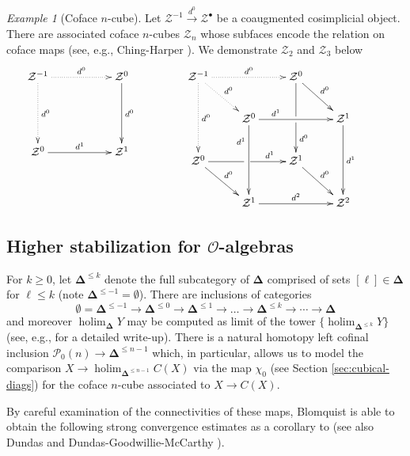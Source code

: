 \documentclass[11pt]{amsart}
\theoremstyle{definition}
\theoremstyle{remark}
\newtheorem{example}[subsection]{Example}
\newcommand{\holim}{\operatorname{holim}}
\newcommand{\Cal}[1]{\mathcal{#1}}
\newcommand{\bdel}{\mathbf{\Delta}}
\begin{document}
\begin{example}[Coface $n$-cube]
    Let $\Cal{Z}^{-1}\xrightarrow{d^0} \Cal{Z}^{\bullet}$ be a coaugmented cosimplicial object. There are associated coface $n$-cubes $\Cal{Z}_n$ whose subfaces encode the relation on coface maps (see, e.g.,  Ching-Harper \cite[]{Ching-Harper-Koszul}). We demonstrate $\Cal{Z}_2$ and $\Cal{Z}_3$ below \[ \xymatrix{ \Cal{Z}^{-1} \ar@{.>}[rr]^-{d^0} \ar@{.>}[dd]^-{d^0} && \Cal{Z}^0 \ar[dd]^-{d^0} \\ && \\ \Cal{Z}^0 \ar[rr]^-{d^1} && \Cal{Z}^1 }\hspace{1.5cm}
     \xymatrix{ 
     \Cal{Z}^{-1} \ar@{.>}[rr]^-{d^0} \ar@{.>}[dd]^-{d^0} \ar@{.>}[dr]^-{d^0} & & \Cal{Z}^0\ar[dr]^-{d^0} \ar[dd]|\hole^<(.7){d^0} && \\
     & \Cal{Z}^0\ar[rr]^<(.2){d^1} \ar[dd]_<(.2){d^1} && \Cal{Z}^1 \ar[dd]^-{d^1} \\
     \Cal{Z}^0 \ar[rr]|\hole^<(.7){d^1} \ar[dr]^-{d^0} && \Cal{Z}^1 \ar[dr]^-{d^0} & \\
     & \Cal{Z}^1 \ar[rr]^-{d^2} && \Cal{Z}^2 }\]
\end{example}

\subsection{Higher stabilization for $\Cal{O}$-algebras}
\label{delta-leq-k}
For $k\geq 0$, let $\bdel^{\leq k}$ denote the full subcategory of $\bdel$ comprised of sets $[\ell]\in \bdel$ for $\ell\leq k$ (note $\bdel^{\leq -1}=\emptyset$). There are inclusions of categories \[\emptyset=\bdel^{\leq -1} \to \bdel^{\leq 0} \to \bdel^{\leq 1} \to \dots \to \bdel^{\leq k}\to \cdots \to \bdel\] and moreover $\holim_{\bdel} Y$ may be computed as limit of the tower $\{\holim_{\bdel^{\leq k}} Y\}$ (see, e.g.,  \cite[]{Ching-Harper-Koszul} for a detailed write-up). There is a natural homotopy left cofinal inclusion  $\Cal{P}_0(n)\to \bdel^{\leq n-1}$ which, in particular, allows us to model the comparison $X\to \holim_{\bdel^{\leq n-1}} C(X)$ via the map $\chi_0$ (see Section \ref{sec:cubical-diags}) for the coface $n$-cube associated to $X\to C(X)$. 

By careful examination of the connectivities of these maps, Blomquist is able to obtain the following strong convergence estimates as a corollary to \cite[7.1]{Blom} (see also Dundas \cite{Dundas-1} and Dundas-Goodwillie-McCarthy \cite{DGM}).
\end{document}
